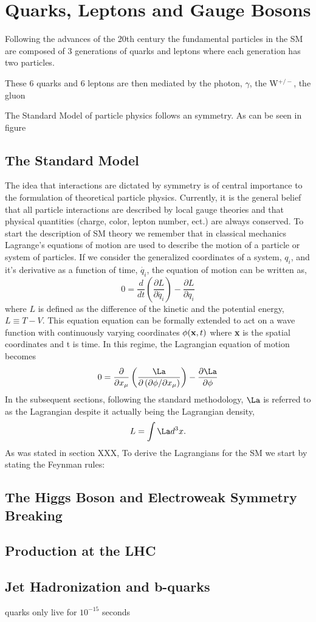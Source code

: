 \section{Quarks, Leptons and Gauge Bosons}
Following the advances of the 20th century the fundamental
particles in the SM are composed of 3 generations of quarks and leptons
where each generation has two particles. 

These 6 quarks and 6 leptons
are then mediated by the photon, $\gamma$, the W$^{+/-}$, the gluon

The Standard Model of particle physics follows an %
symmetry. As can be seen in figure %
\subsection{The Standard Model}%
The idea that interactions are dictated by symmetry is of central
importance to the formulation of theoretical particle physics. 
Currently, it is the general belief that all particle interactions are
described by local gauge theories and that 
physical quantities (charge, color, lepton number, ect.) are 
always conserved.
To start the description of SM theory we remember that in classical 
mechanics Lagrange's equations of motion are used to
describe the motion of a particle or system of particles. %
If we consider the generalized coordinates of a system, $q_{i}$,
and it's derivative as a function of time, $\dot{q_{i}}$, the equation
of motion can be written as,
\begin{displaymath}
0=\frac{d}{dt}\left(\frac{\partial L}{\partial\dot{q_{i}}}\right) - \frac{\partial L}{\partial q_{i}}
\end{displaymath}
where $L$ is defined as the difference of the kinetic and the potential energy, $L\equiv T-V$.
This equation equation can be formally extended to act on a wave function with %
continuously varying coordinates $\phi({\bf x},t)$
where {\bf x} is the spatial coordinates and t is time.
In this regime, the Lagrangian equation of motion becomes
\begin{displaymath}
0=\frac{\partial}{\partial x_{\mu}}\left( \frac{\La}{\partial\left(\partial\phi/\partial x_{\mu}\right)}\right)-\frac{\partial\La}{\partial\phi}
\end{displaymath}
In the subsequent sections, following the standard methodology, $\La$ is referred to as the Lagrangian
despite it actually being the Lagrangian density,
\begin{displaymath}
L=\int{\La d^{3}x}.
\end{displaymath}
As was stated in section XXX,%
To derive the Lagrangians for the SM we start by stating
the Feynman rules:

\subsection{The Higgs Boson and Electroweak Symmetry Breaking}
\subsection{\bbbar Production at the LHC}


\subsection{Jet Hadronization and b-quarks}%
quarks only live for $10^{-15}$ seconds